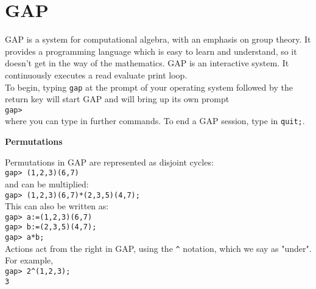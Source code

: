 \documentclass[12pt]{amsart}
\theoremstyle{definition}
\begin{document}
\section{GAP}
GAP is a system for computational algebra, with an emphasis on group theory.  It provides a programming language which is easy to learn and understand, so it doesn't get in the way of the mathematics.  GAP is an interactive system. It continuously executes a read evaluate print loop.\\

To begin, typing \verb"gap" at the prompt of your operating system followed by the return key will start GAP and will bring up its own prompt\\
\verb"gap>"\\
where you can type in further commands.  To end a GAP session, type in \verb"quit;".

\begin{center}
\textbf{Permutations}
\end{center}

Permutations in GAP are represented as disjoint cycles:\\
\verb"gap> (1,2,3)(6,7)"\\
and can be multiplied:\\
\verb"gap> (1,2,3)(6,7)*(2,3,5)(4,7);"\\
This can also be written as:\\
\verb"gap> a:=(1,2,3)(6,7)"\\
\verb"gap> b:=(2,3,5)(4,7);"\\
\verb"gap> a*b;"\\

Actions act from the right in GAP, using the \verb"^" notation, which we say as "under".  For example,\\
\verb"gap> 2^(1,2,3);"\\
\verb"3"\\
\end{document}
